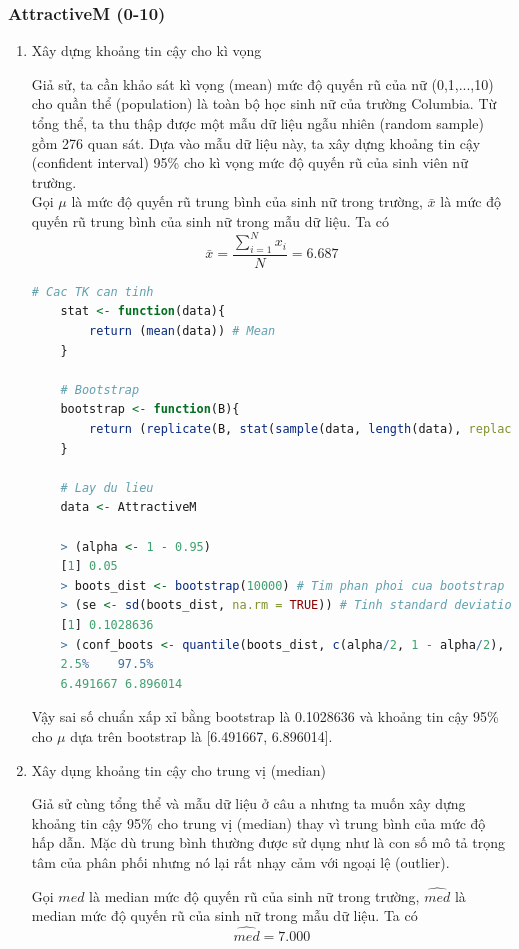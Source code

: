 \documentclass[a4paper,12pt]{article}
\begin{document}
	\subsubsection{AttractiveM (0-10)}
	\begin{enumerate}[label = \alph*)]
		\item Xây dựng khoảng tin cậy cho kì vọng
	
	Giả sử, ta cần khảo sát kì vọng (mean) mức độ quyến rũ của nữ (0,1,...,10) cho quần thể (population) là toàn bộ học sinh nữ của trường Columbia. Từ tổng thể, ta thu thập được một mẫu dữ liệu ngẫu nhiên (random sample) gồm 276 quan sát. Dựa vào mẫu dữ liệu này, ta xây dựng khoảng tin cậy (confident interval) 95\% cho kì vọng mức độ quyến rũ của sinh viên nữ trường.\\
	
	Gọi $\mu$ là mức độ quyến rũ trung bình của sinh nữ trong trường, $\bar{x}$ là mức độ quyến rũ trung bình của sinh nữ
	trong mẫu dữ liệu. Ta có
	$$\bar{x} = \frac{\sum_{i = 1}^{N}x_i}{N} =  6.687$$
	
	\begin{lstlisting}[language=R]
	# Cac TK can tinh
	stat <- function(data){
		return (mean(data)) # Mean
	}
	
	# Bootstrap
	bootstrap <- function(B){
		return (replicate(B, stat(sample(data, length(data), replace = TRUE))))
	}
	
	# Lay du lieu
	data <- AttractiveM
	
	> (alpha <- 1 - 0.95)
	[1] 0.05
	> boots_dist <- bootstrap(10000) # Tim phan phoi cua bootstrap
	> (se <- sd(boots_dist, na.rm = TRUE)) # Tinh standard deviation (missing value se bi bo qua)
	[1] 0.1028636
	> (conf_boots <- quantile(boots_dist, c(alpha/2, 1 - alpha/2), na.rm = TRUE)) # Tim khoang tin cay cho p
	2.5%    97.5% 
	6.491667 6.896014
	\end{lstlisting}
	Vậy sai số chuẩn xấp xỉ bằng bootstrap là 0.1028636 và khoảng tin cậy 95\% cho $\mu$ dựa trên bootstrap
	là [6.491667, 6.896014].
		\item Xây dụng khoảng tin cậy cho trung vị (median)
		
		Giả sử cùng tổng thể và mẫu dữ liệu ở câu a nhưng ta muốn xây dựng khoảng tin cậy 95\% cho
		trung vị (median) thay vì trung bình của mức độ hấp dẫn. Mặc dù trung bình thường được sử dụng như
		là con số mô tả trọng tâm của phân phối nhưng nó lại rất nhạy cảm với ngoại lệ (outlier).
		
		Gọi $med$ là median mức độ quyến rũ của sinh nữ trong trường, $\hat{med}$ là median mức độ quyến rũ của sinh nữ trong mẫu dữ liệu. Ta có
		$$\hat{med} = 7.000$$
		

\end{enumerate}
\end{document}
